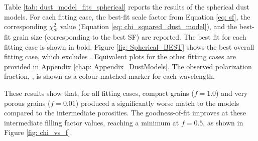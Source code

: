 
Table \ref{tab: dust_model_fits_spherical} reports the results of the spherical dust models. For each fitting case, the best-fit scale factor from Equation \ref{eq: sf}, the corresponding $\chi_\mathcal{P}^2$ value (Equation \ref{eq: chi_squared_dust_model}), and the best-fit grain size (\amax corresponding to the best SF) are reported. The best fit for each fitting case is shown in bold. Figure \ref{fig: Spherical_BEST} shows the best overall fitting case, which excludes \bfiveNS. Equivalent plots for the other fitting cases are provided in Appendix \ref{chap: Appendix_DustModels}. The observed polarization fraction, \POLFsiNS, is shown as a colour-matched marker for each wavelength. 


These results show that, for all fitting cases, compact grains ($f = 1.0$) and very porous grains ($f = 0.01$) produced a significantly worse match to the models compared to the intermediate porosities. The goodness-of-fit improves at these intermediate filling factor values, reaching a minimum at $f = 0.5$, as shown in Figure \ref{fig: chi_vs_f}. 




